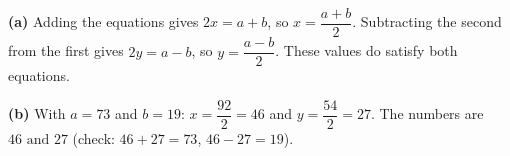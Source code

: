 \textbf{(a)} Adding the equations gives $2x=a+b$, so $x=\dfrac{a+b}{2}$. Subtracting the second from the first gives $2y=a-b$, so $y=\dfrac{a-b}{2}$. These values do satisfy both equations.

\textbf{(b)} With $a=73$ and $b=19$: $x=\dfrac{92}{2}=46$ and $y=\dfrac{54}{2}=27$. The numbers are $\boxed{46\text{ and }27}$ (check: $46+27=73$, $46-27=19$).
